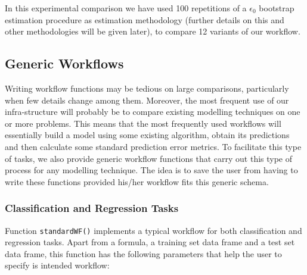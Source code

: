 \documentclass[10pt,a4paper]{article}\usepackage[]{graphicx}\usepackage[]{color}
\begin{document}
In this experimental comparison we have used 100 repetitions of a $\epsilon_0$ 
bootstrap estimation procedure as estimation methodology (further
details on this and other methodologies will be given later), to
compare 12 variants of our workflow. 

\subsection{Generic Workflows}

Writing workflow functions may be tedious on large comparisons,
particularly when few details change among them. Moreover, the most
frequent use of our infra-structure will probably be to compare
existing modelling techniques on one or more problems. This means that
the most frequently used workflows will essentially build a model
using some existing algorithm, obtain its predictions and then
calculate some standard prediction error metrics. To facilitate this type of tasks, we
also provide generic workflow functions that carry out this type
of process for any modelling technique. The idea is to save the user
from having to write these functions provided his/her workflow fits
this generic schema.

\subsubsection{Classification and Regression Tasks}

Function \texttt{standardWF()} implements a typical workflow for both
classification and regression tasks. Apart from a formula, a training set data frame and a test set data frame, this function has the following parameters that help the user to specify is intended workflow:
\end{document}
